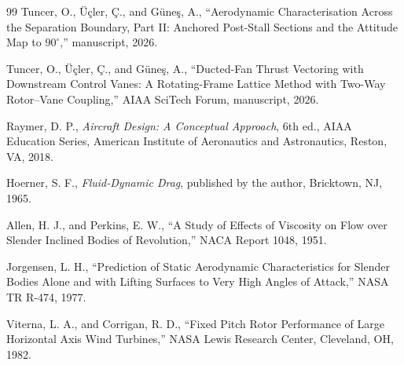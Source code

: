 \documentclass[11pt,a4paper]{article}
\newcommand{\dg}{^\circ}
\begin{document}
\begin{thebibliography}{99}
Tuncer, O., \"U\c{c}ler, \c{C}., and G\"une\c{s}, A.,
``Aerodynamic Characterisation Across the Separation Boundary,
Part II: Anchored Post-Stall Sections and the Attitude Map to
$90\dg$,'' manuscript, 2026.

Tuncer, O., \"U\c{c}ler, \c{C}., and G\"une\c{s}, A.,
``Ducted-Fan Thrust Vectoring with Downstream Control Vanes: A
Rotating-Frame Lattice Method with Two-Way Rotor--Vane Coupling,''
AIAA SciTech Forum, manuscript, 2026.

Raymer, D. P.,
\emph{Aircraft Design: A Conceptual Approach}, 6th ed.,
AIAA Education Series, American Institute of Aeronautics and
Astronautics, Reston, VA, 2018.

Hoerner, S. F.,
\emph{Fluid-Dynamic Drag},
published by the author, Bricktown, NJ, 1965.

Allen, H. J., and Perkins, E. W.,
``A Study of Effects of Viscosity on Flow over Slender Inclined Bodies
of Revolution,'' NACA Report 1048, 1951.

Jorgensen, L. H.,
``Prediction of Static Aerodynamic Characteristics for Slender Bodies
Alone and with Lifting Surfaces to Very High Angles of Attack,''
NASA TR R-474, 1977.

Viterna, L. A., and Corrigan, R. D.,
``Fixed Pitch Rotor Performance of Large Horizontal Axis Wind
Turbines,'' NASA Lewis Research Center, Cleveland, OH, 1982.

\end{thebibliography}
\end{document}
